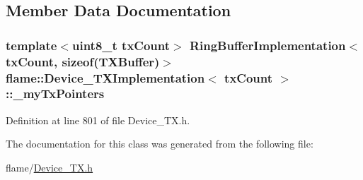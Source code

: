 \subsection{Member Data Documentation}
\hypertarget{classflame_1_1_device___t_x_implementation_a53941d1a746623722c4d3a4e5de05f78}{
\subsubsection[{\-\_\-my\-Tx\-Pointers}]{\setlength{\rightskip}{0pt plus 5cm}template$<$uint8\-\_\-t tx\-Count$>$ {\bf Ring\-Buffer\-Implementation}$<$tx\-Count, sizeof({\bf T\-X\-Buffer})$>$ {\bf flame\-::\-Device\-\_\-\-T\-X\-Implementation}$<$ tx\-Count $>$\-::\-\_\-my\-Tx\-Pointers\hspace{0.3cm}{\ttfamily [protected]}}}\label{classflame_1_1_device___t_x_implementation_a53941d1a746623722c4d3a4e5de05f78}


Definition at line 801 of file Device\-\_\-\-T\-X.\-h.



The documentation for this class was generated from the following file\-:\begin{DoxyCompactItemize}
\item 
flame/\hyperlink{_device___t_x_8h}{Device\-\_\-\-T\-X.\-h}\end{DoxyCompactItemize}
